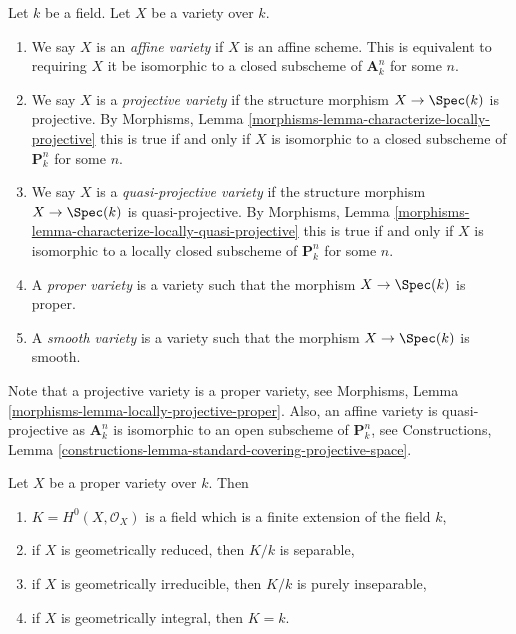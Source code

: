 \begin{definition}
\label{definition-variety-type}
Let $k$ be a field. Let $X$ be a variety over $k$.
\begin{enumerate}
\item We say $X$ is an {\it affine variety} if $X$ is an affine scheme.
This is equivalent to requiring $X$ it be isomorphic to a closed
subscheme of $\mathbf{A}^n_k$ for some $n$.
\item We say $X$ is a {\it projective variety} if the
structure morphism $X \to \Spec(k)$ is projective. By
Morphisms, Lemma \ref{morphisms-lemma-characterize-locally-projective}
this is true if and only if $X$ is isomorphic to a closed
subscheme of $\mathbf{P}^n_k$ for some $n$.
\item We say $X$ is a {\it quasi-projective variety} if
the structure morphism $X \to \Spec(k)$ is quasi-projective. By
Morphisms, Lemma \ref{morphisms-lemma-characterize-locally-quasi-projective}
this is true if and only if $X$ is isomorphic to a
locally closed subscheme of $\mathbf{P}^n_k$ for some $n$.
\item A {\it proper variety} is a variety such that the
morphism $X \to \Spec(k)$ is proper.
\item A {\it smooth variety} is a variety such that the
morphism $X \to \Spec(k)$ is smooth.
\end{enumerate}
\end{definition}

\noindent
Note that a projective variety is a proper variety, see
Morphisms, Lemma \ref{morphisms-lemma-locally-projective-proper}.
Also, an affine variety is quasi-projective as $\mathbf{A}^n_k$
is isomorphic to an open subscheme of $\mathbf{P}^n_k$, see
Constructions,
Lemma \ref{constructions-lemma-standard-covering-projective-space}.

\begin{lemma}
\label{lemma-regular-functions-proper-variety}
Let $X$ be a proper variety over $k$. Then
\begin{enumerate}
\item $K = H^0(X, \mathcal{O}_X)$ is a field which is
a finite extension of the field $k$,
\item if $X$ is geometrically reduced, then $K/k$ is separable,
\item if $X$ is geometrically irreducible, then $K/k$
is purely inseparable,
\item if $X$ is geometrically integral, then $K = k$.
\end{enumerate}
\end{lemma}


